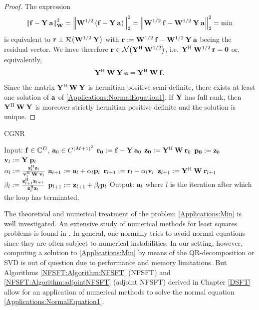   \begin{proof}
    The expression 
    \[
      \left\|\mathbf{f} - \mathbf{Y}\:\mathbf{a}\right\|_{\mathbf{W}}^2 = 
      \left\|\mathbf{W}^{1/2}\left(\mathbf{f} - \mathbf{Y}\:\mathbf{a}\right)\right\|_{2}^2 = 
      \left\|\mathbf{W}^{1/2}\:\mathbf{f} - \mathbf{W}^{1/2}\:\mathbf{Y}\:\mathbf{a}\right\|_{2}^2 = \text{min}
    \]  
    is equivalent to
    $\mathbf{r} \perp \mathcal{R}{\hspace{-0.4ex}}\left(\mathbf{W}^{1/2}\:\mathbf{Y}\right)$ with $\mathbf{r} := 
    \mathbf{W}^{1/2}\:\mathbf{f} - \mathbf{W}^{1/2}\:\mathbf{Y}\:\mathbf{a}$ beeing the 
    residual vector. We have therefore $\mathbf{r} \in \mathcal{N}{\hspace{-0.4ex}}\left(\mathbf{Y}^{\text{\rm{H}}}\:\mathbf{W}^{1/2}\right)$,
    i.e. $\mathbf{Y}^{\text{\rm{H}}}\:\mathbf{W}^{1/2}\:\mathbf{r} = \mathbf{0}$ or, equivalently,
    \[
      \mathbf{Y^{\text{\rm{H}}}} \: \mathbf{W} \: \mathbf{Y} \: \mathbf{a} = \mathbf{Y^{\text{\rm{H}}}} \: \mathbf{W} \: \mathbf{f}.
    \]
    Since the matrix $\mathbf{Y^{\text{\rm{H}}}} \: \mathbf{W} \: \mathbf{Y}$ is hermitian positive semi-definite, there 
    exists at least one solution of $\mathbf{a}$ of \eqref{Applications:NormalEquation1}. If 
    $\mathbf{Y}$ has full rank, then $\mathbf{Y}^{\text{\rm{H}}} \: \mathbf{W} \: \mathbf{Y}$ is moreover strictly 
    hermitian positive definite and the solution is unique.
  \end{proof}

  \begin{algorithm}[tb]
    \caption{CGNR}
    \label{Applications:Algorithm:CGNR}    
	  \begin{algorithmic}
	    \STATE  Input:  $\mathbf{f} \in \mathbb{C}^{D}$, $\mathbf{a}_{0} \in C^{(M+1)^2}$
	    \STATE
	    \STATE $\mathbf{r_{0}} := \mathbf{f} - \mathbf{Y} \: \mathbf{a}_{0}$
	    \STATE $\mathbf{z_{0}} := \mathbf{Y}^{\text{\rm{H}}} \: \mathbf{W} \: \mathbf{r}_{0}$
	    \STATE $\mathbf{p_{0}} := \mathbf{z}_{0}$
	    \STATE 
	      \STATE $\mathbf{v}_{l} := \mathbf{Y} \; \mathbf{p}_{l}$\\[0.5ex]
	      \STATE $\alpha_{l} := \frac{\mathbf{z}_{l}^{\text{\rm{H}}} \mathbf{z}_{l}}{\mathbf{v}_{l}^{\text{\rm{H}}} \: \mathbf{W} \: \mathbf{v}_{l}}$  
	      \STATE $\mathbf{a}_{l+1} := \mathbf{a}_{l} + \alpha_{l} \mathbf{p}_{l}$
	      \STATE $\mathbf{r}_{l+1} := \mathbf{r}_{l} - \alpha_{l} \mathbf{v}_{l}$
	      \STATE $\mathbf{z}_{l+1} := \mathbf{Y}^{\text{\rm{H}}} \: \mathbf{W} \: \mathbf{r}_{l+1}$
	      \STATE $\beta_{l}   := \frac{\mathbf{z}_{l+1}^{\text{\rm{H}}} \mathbf{z}_{l+1}}{\mathbf{z}_{l}^{\text{\rm{H}}} \mathbf{z}_{l}}$
	      \STATE $\mathbf{p}_{l+1} := \mathbf{z}_{l+1} + \beta_{l} \mathbf{p}_{l}$
	    \ENDFOR
	    \STATE
	    \STATE Output: $\mathbf{a}_{l}$ where $l$ is the iteration after which the loop has terminated.
	  \end{algorithmic}
  \end{algorithm}
  
  The theoretical and numerical treatment of the problem \eqref{Applications:Min}
  is well investigated. An extensive study of numerical methods for least 
  squares problems is found in \cite{bjoerk}. In general, one normally tries to
  avoid normal equations since they are often subject to numerical instabilities. In
  our setting, however, computing a solution to \eqref{Applications:Min}
  by means of the QR-decomposition or SVD is out of question due to performance and memory limitations. 
  But Algorithms \ref{NFSFT:Algorithm:NFSFT} (NFSFT) and \ref{NFSFT:Algorithm:adjointNFSFT} 
  (adjoint NFSFT) derived in Chapter \ref{DSFT} allow for an application of 
  numerical methods to solve the normal equation \eqref{Applications:NormalEquation1}. 
  
